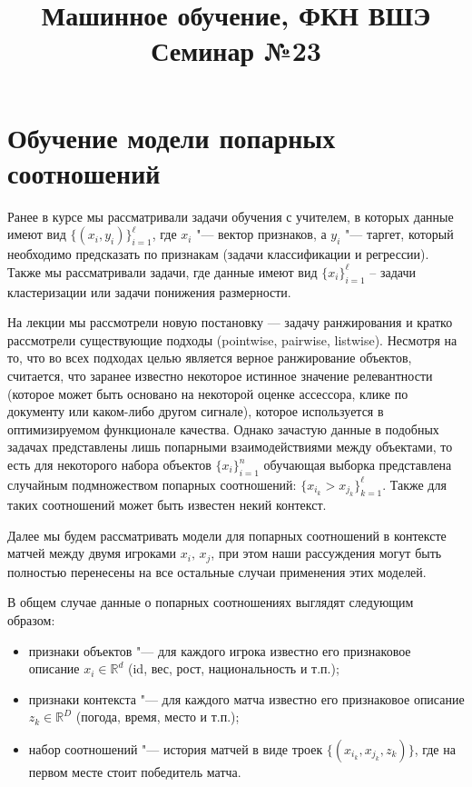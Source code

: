 \documentclass[12pt,a4paper]{article}
\title{Машинное обучение, ФКН ВШЭ\\Семинар №23}
\begin{document}
\author{}
\date{}
\maketitle

\section{Обучение модели попарных соотношений}

Ранее в курсе мы рассматривали задачи обучения с учителем, в которых данные имеют  вид $\{(x_i, y_i)\}_{i=1}^\ell$, где $x_i$ "--- вектор признаков, а $y_i$ "--- таргет, который необходимо предсказать по признакам (задачи классификации и регрессии). Также мы рассматривали задачи, где данные имеют вид $\{x_i\}_{i=1}^\ell$ – задачи кластеризации или задачи понижения размерности. 
\par На лекции мы рассмотрели новую постановку — задачу ранжирования и кратко рассмотрели существующие подходы (pointwise, pairwise, listwise). Несмотря на то, что во всех подходах целью является верное ранжирование объектов, считается, что заранее известно некоторое истинное значение релевантности (которое может быть основано на некоторой оценке ассессора, клике по документу или каком-либо другом сигнале), которое используется в оптимизируемом функционале качества. Однако зачастую данные в подобных задачах представлены лишь попарными взаимодействиями между объектами, то есть для некоторого набора объектов $\{x_i\}_{i=1}^n$ обучающая выборка представлена случайным подмножеством попарных соотношений: $\{ x_{i_k} > x_{j_k} \}_{k=1}^\ell$. Также для таких соотношений может быть известен некий контекст.
\par Далее мы будем рассматривать модели для попарных соотношений в контексте матчей между двумя игроками $x_i, \, x_j$, при этом наши рассуждения могут быть полностью перенесены на все остальные случаи применения этих моделей.

В общем случае данные о попарных соотношениях выглядят следующим образом: 
\begin{itemize}
	\item признаки объектов "--- для каждого игрока известно его признаковое описание $x_i \in \mathbb{R}^d$ (id, вес, рост, национальность и т.п.);
	\item признаки контекста "--- для каждого матча известно его признаковое описание $z_k \in \mathbb{R}^{D}$ (погода, время, место и т.п.);
	\item набор соотношений "--- история матчей в виде троек $\{ (x_{i_k}, x_{j_k}, z_k)\}$, где на первом месте стоит победитель матча.
\end{itemize} 
\newpage
\end{document}
